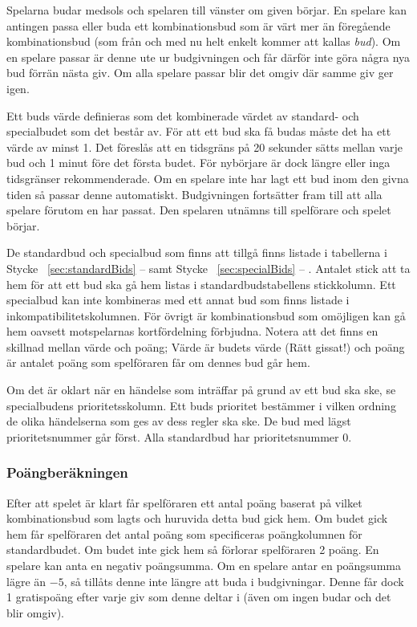 \documentclass[a4paper]{article}
\renewcommand{\sectionref}[1]{%
	\ref{sec:#1} -- \nameref{sec:#1}%
}
\begin{document}
				Spelarna budar medsols och spelaren till vänster om given börjar. En spelare kan antingen passa eller buda ett kombinationsbud som är värt mer än föregående kombinationsbud (som från och med nu helt enkelt kommer att kallas \emph{bud}). Om en spelare passar är denne ute ur budgivningen och får därför inte göra några nya bud förrän nästa giv. Om alla spelare passar blir det omgiv där samme giv ger igen.

				Ett buds värde definieras som det kombinerade värdet av standard- och specialbudet som det består av. För att ett bud ska få budas måste det ha ett värde av minst 1. Det föreslås att en tidsgräns på 20 sekunder sätts mellan varje bud och 1 minut före det första budet. För nybörjare är dock längre eller inga tidsgränser rekommenderade. Om en spelare inte har lagt ett bud inom den givna tiden så passar denne automatiskt. Budgivningen fortsätter fram till att alla spelare förutom en har passat. Den spelaren utnämns till spelförare och spelet börjar.

				De standardbud och specialbud som finns att tillgå finns listade i tabellerna i Stycke~\sectionref{standardBids} samt Stycke~\sectionref{specialBids}. Antalet stick att ta hem för att ett bud ska gå hem listas i standardbudstabellens stickkolumn. Ett specialbud kan inte kombineras med ett annat bud som finns listade i inkompatibilitetskolumnen. För övrigt är kombinationsbud som omöjligen kan gå hem oavsett motspelarnas kortfördelning förbjudna. Notera att det finns en skillnad mellan värde och poäng; Värde är budets värde (Rätt gissat!) och poäng är antalet poäng som spelföraren får om dennes bud går hem.

				Om det är oklart när en händelse som inträffar på grund av ett bud ska ske, se specialbudens prioritetsskolumn. Ett buds prioritet bestämmer i vilken ordning de olika händelserna som ges av dess regler ska ske. De bud med lägst prioritetsnummer går först. Alla standardbud har prioritetsnummer 0.

			\subsubsection{Poängberäkningen}
				Efter att spelet är klart får spelföraren ett antal poäng baserat på vilket kombinationsbud som lagts och huruvida detta bud gick hem. Om budet gick hem får spelföraren det antal poäng som specificeras poängkolumnen för standardbudet. Om budet inte gick hem så förlorar spelföraren 2 poäng. En spelare kan anta en negativ poängsumma. Om en spelare antar en poängsumma lägre än $-5$, så tillåts denne inte längre att buda i budgivningar. Denne får dock 1 gratispoäng efter varje giv som denne deltar i (även om ingen budar och det blir omgiv).
\end{document}
